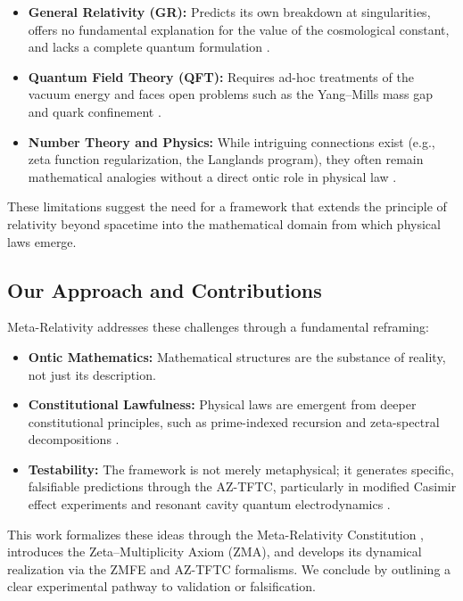\documentclass[12]{amsart}
\theoremstyle{plain}
\begin{document}
\begin{itemize}
    \item \textbf{General Relativity (GR):} Predicts its own breakdown at singularities, offers no fundamental explanation for the value of the cosmological constant, and lacks a complete quantum formulation \cite{weinberg1989}.
    \item \textbf{Quantum Field Theory (QFT):} Requires ad-hoc treatments of the vacuum energy and faces open problems such as the Yang--Mills mass gap and quark confinement \cite{clayym}.
    \item \textbf{Number Theory and Physics:} While intriguing connections exist (e.g., zeta function regularization, the Langlands program), they often remain mathematical analogies without a direct ontic role in physical law \cite{edwards1974, langlands1970}.
\end{itemize}

These limitations suggest the need for a framework that extends the principle of relativity beyond spacetime into the mathematical domain from which physical laws emerge.

\subsection{Our Approach and Contributions}

Meta-Relativity addresses these challenges through a fundamental reframing:

\begin{itemize}
    \item \textbf{Ontic Mathematics:} Mathematical structures are the substance of reality, not just its description.
    \item \textbf{Constitutional Lawfulness:} Physical laws are emergent from deeper constitutional principles, such as prime-indexed recursion and zeta-spectral decompositions \cite{ZMAAxiom, ZMFEFormulation}.
    \item \textbf{Testability:} The framework is not merely metaphysical; it generates specific, falsifiable predictions through the AZ-TFTC, particularly in modified Casimir effect experiments and resonant cavity quantum electrodynamics \cite{CasimirReport}.
\end{itemize}

This work formalizes these ideas through the Meta-Relativity Constitution \cite{MRPConstitution}, introduces the Zeta--Multiplicity Axiom (ZMA), and develops its dynamical realization via the ZMFE and AZ-TFTC formalisms. We conclude by outlining a clear experimental pathway to validation or falsification.
\end{document}
